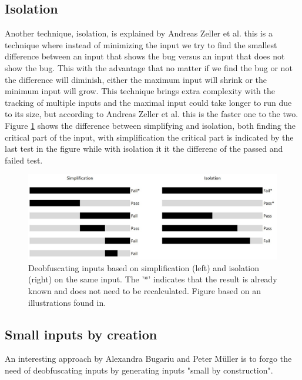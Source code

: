 \subsection{Isolation}
Another technique, isolation, is explained by Andreas Zeller et al. 
\cite{5zeller2002simplifyingIsolatingFailure-inducing} this is a technique where instead of minimizing the input we try to find the smallest difference between an input that shows the bug versus an input that does not show the bug. This with the advantage that no matter if we find the bug or not the difference will diminish, either the maximum input will shrink or the minimum input will grow. This technique brings extra complexity with the tracking of multiple inputs and the maximal input could take longer to run due to its size, but according to Andreas Zeller et al. this is the faster one to the two. Figure
\ref{fig:simplificationIsolation} shows the difference between simplifying and isolation, both finding the critical part of the input, with simplification the critical part is indicated by the last test in the figure while with isolation it it the differenc of the passed and failed test.
\begin{figure}
	\centering
	\includegraphics[width=1.0\textwidth]{images/simplificationIsolation}
	\caption{Deobfuscating inputs based on simplification (left) and isolation (right) on the same input. The '*' indicates that the result is already known and does not need to be recalculated. Figure based on an illustrations found in\cite{bookZellerwhyProgramsFail}.}
	\label{fig:simplificationIsolation}
\end{figure}

\subsection{Small inputs by creation}
An interesting approach by Alexandra Bugariu and Peter M\"uller\cite{9bugariu2020automaticallyTestingStringSolvers} is to forgo the need of deobfuscating inputs by generating inputs "small by construction".

